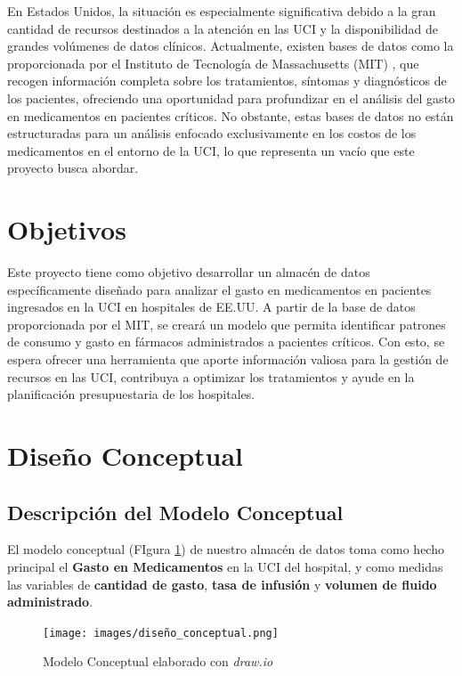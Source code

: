 \documentclass{article}
\begin{document}
En Estados Unidos, la situación es especialmente significativa debido a la gran cantidad de recursos destinados a la atención en las UCI y la disponibilidad de grandes volúmenes de datos clínicos. Actualmente, existen bases de datos como la proporcionada por el Instituto de Tecnología de Massachusetts (MIT) \cite{eicu_crd}, que recogen información completa sobre los tratamientos, síntomas y diagnósticos de los pacientes, ofreciendo una oportunidad para profundizar en el análisis del gasto en medicamentos en pacientes críticos. No obstante, estas bases de datos no están estructuradas para un análisis enfocado exclusivamente en los costos de los medicamentos en el entorno de la UCI, lo que representa un vacío que este proyecto busca abordar.

\section{Objetivos}
\label{sec:objetivos}

Este proyecto tiene como objetivo desarrollar un almacén de datos específicamente diseñado para analizar el gasto en medicamentos en pacientes ingresados en la UCI en hospitales de EE.UU. A partir de la base de datos proporcionada por el MIT, se creará un modelo que permita identificar patrones de consumo y gasto en fármacos administrados a pacientes críticos. Con esto, se espera ofrecer una herramienta que aporte información valiosa para la gestión de recursos en las UCI, contribuya a optimizar los tratamientos y ayude en la planificación presupuestaria de los hospitales.

\section{Diseño Conceptual}
\label{sec:diseno_conceptual}

\subsection{Descripción del Modelo Conceptual}

El modelo conceptual (FIgura \ref{fig:conceptual}) de nuestro almacén de datos toma como hecho principal el \textbf{Gasto en Medicamentos} en la UCI del hospital, y como medidas las variables de \textbf{cantidad de gasto}, \textbf{tasa de infusión} y \textbf{volumen de fluido administrado}.

\begin{figure}[H]
	\centering
	\texttt{[image: images/diseño\_conceptual.png]}
	\caption{Modelo Conceptual elaborado con \textit{draw.io} \cite{drawio}}
	\label{fig:conceptual}
\end{figure}
\end{document}
